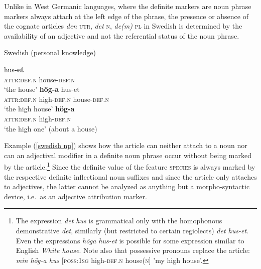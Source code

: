 Unlike in West Germanic languages, where the definite markers are noun phrase markers always attach at the left edge of the phrase, the presence or absence of the cognate articles \textit{den} \textsc{utr}, \textit{det} \textsc{n}, \textit{de(m)} \textsc{pl} in Swedish is determined by the availability of an adjective and not the referential status of the noun phrase. 
\begin{exe}
\label{swedish np}
\ex \rm{Swedish (personal knowledge)}
\begin{xlist}
\ex
{} hus\textbf{-et}\\
	\textsc{attr:def.n} house-\textsc{def:n}\\
\glt	‘the house’
\ex	
{} \textbf{hög-a} hus-et\\
	\textsc{attr:def.n} high-\textsc{def.n} house-\textsc{def.n}\\
\glt	‘the high house’
\label{art0}
\ex 
{} \textbf{hög-a}\\
	\textsc{attr:def.n} high-\textsc{def.n}\\
\glt	‘the high one’ (about a house)
\end{xlist}
\end{exe}
Example (\ref{swedish np}) shows how the article can neither attach to a noun nor can an adjectival modifier in a definite noun phrase occur without being marked by the article.\footnote{The expression \textit{det hus} is grammatical only with the homophonous demonstrative \textit{det}, similarly (but restricted to certain regiolects) \textit{det hus-et}. Even the expressions \textit{höga hus-et} is possible for some expression similar to English \textit{White house}. Note also that possessive pronouns replace the article: \textit{min hög-a hus} [\textsc{poss:1sg} high-\textsc{def.n} house(\textsc{n}] 'my high house’.} Since the definite value of the feature \textsc{species} is always marked by the respective definite inflectional noun suffixes %
 and since the article only attaches to adjectives, the latter cannot be analyzed as anything but a morpho-syntactic device, i.e.~as an adjective attribution marker.


